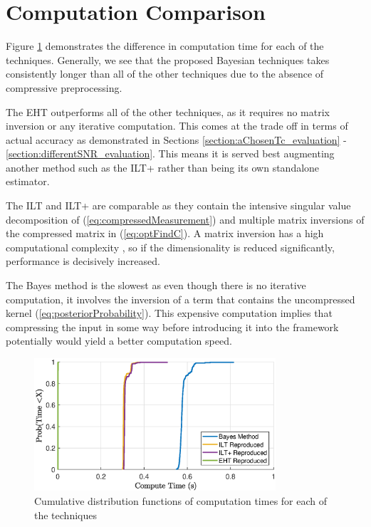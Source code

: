 \section{Computation Comparison}
Figure \ref{fig:computation_time_results} demonstrates the difference in computation time for each of the techniques. Generally, we see that the proposed Bayesian techniques takes consistently longer than all of the other techniques due to the absence of compressive preprocessing.

The EHT outperforms all of the other techniques, as it requires no matrix inversion or any iterative computation. This comes at the trade off in terms of actual accuracy as demonstrated in Sections \ref{section:aChosenTc_evaluation} - \ref{section:differentSNR_evaluation}. This means it is served best augmenting another method such as the ILT+ rather than being its own standalone estimator.

The ILT and ILT+ are comparable as they contain the intensive singular value decomposition of (\ref{eq:compressedMeasurement}) and multiple matrix inversions of the compressed matrix in (\ref{eq:optFindC}). A matrix inversion has a high computational complexity \cite{invertMatrixComputational}, so if the dimensionality is reduced significantly, performance is decisively increased.

The Bayes method is the slowest as even though there is no iterative computation, it involves the inversion of a term that contains the uncompressed kernel (\ref{eq:posteriorProbability}). This expensive computation implies that compressing the input in some way before introducing it into the framework potentially would yield a better computation speed.


\begin{figure}
    \centering
    \includegraphics[width = 0.8\textwidth]{evaluation/compute_time_compare.eps}
    \caption{Cumulative distribution functions of computation times for each of the techniques}
    \label{fig:computation_time_results}
\end{figure}

